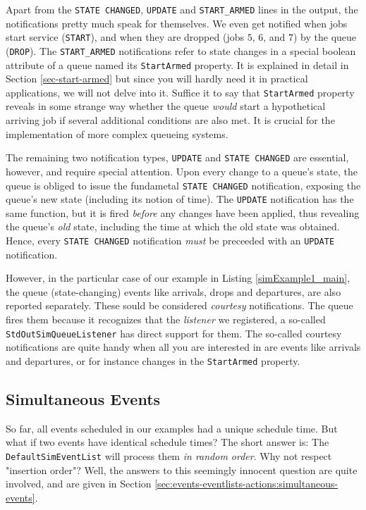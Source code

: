 \documentclass[12pt]{book}
\begin{document}
Apart from the \lstinline-STATE CHANGED-, \lstinline-UPDATE-
  and \lstinline-START_ARMED- lines in the output,
  the notifications pretty much speak for themselves.
We even get notified when jobs start service (\lstinline-START-),
  and when they are dropped (jobs $5$, $6$, and $7$)
  by the queue (\lstinline -DROP-).
The \lstinline-START_ARMED- notifications
  refer to state changes in a special boolean attribute of a
  queue named its \lstinline-StartArmed- property.
It is explained in detail in Section \ref{sec-start-armed}
  but since you will hardly need it in practical applications,
  we will not delve into it.
Suffice it to say that \lstinline|StartArmed| property
  reveals in some strange way
  whether the queue {\em would\/}
  start a hypothetical arriving job
  if several additional conditions are also met.
It is crucial for the implementation
  of more complex queueing systems.

The remaining two notification types, \lstinline|UPDATE| and \lstinline|STATE CHANGED|
  are essential, however, and require special attention.
Upon every change to a queue's state,
  the queue is obliged to issue the fundametal \lstinline|STATE CHANGED| notification,
  exposing the queue's new state (including its notion of time).
The \lstinline|UPDATE| notification
  has the same function,
  but it is fired {\em before\/} any changes have been applied,
  thus revealing the queue's {\em old\/} state,
  including the time at which the old state was obtained.
Hence,
  every \lstinline|STATE CHANGED| notification
  {\em must\/} be preceeded with an
  \lstinline|UPDATE| notification.

However, in the particular case of our example in Listing \ref{simExample1_main},
  the queue (state-changing) events like arrivals, drops and departures,
  are also reported separately.
These sould be considered {\em courtesy\/} notifications.
The queue fires them because it recognizes that the
  {\em listener\/} we registered,
  a so-called \lstinline|StdOutSimQueueListener|
  has direct support for them.
The so-called courtesy notifications are quite handy when all
  you are interested in are events like arrivals and
  departures, or for instance changes in the \lstinline|StartArmed| property.

\subsection{Simultaneous Events}
\label{sec:guided:simultaneous-events}

So far, all events scheduled in our examples had a unique schedule time.
But what if two events have identical schedule times?
The short answer is: The \lstinline|DefaultSimEventList| will
  process them {\em in random order}.
Why not respect "insertion order"?
Well, the answers to this seemingly innocent question
  are quite involved, and are given in
  Section \ref{sec:events-eventlists-actions:simultaneous-events}.
\end{document}
